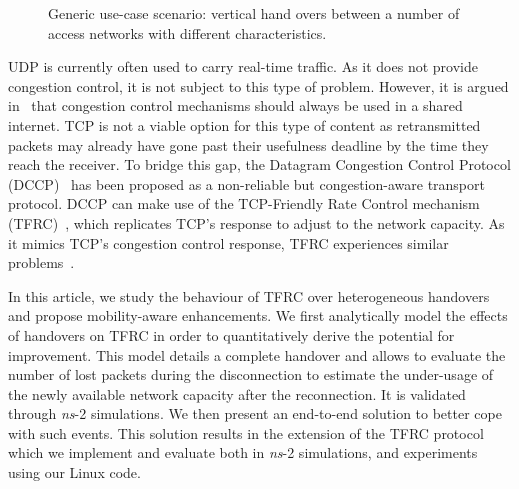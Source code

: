\documentclass[twocolumn]{nictatechreport}
\newcommand{\ns}{\textit{ns}}
\begin{document}
\begin{figure}[hb] \centering 
  
  \caption[Generic use-case scenario]{Generic use-case scenario: vertical hand
  overs between a number of access networks with different characteristics.}

  \label{fig:heterogeneous}
\end{figure} 

UDP is currently often used to carry real-time traffic. As it does not provide
congestion control, it is not subject to this type of problem. However, it is
argued in~\cite{1999floyd_end2end_congestion_control} that congestion control
mechanisms should always be used in a shared internet.  TCP is not a viable
option for this type of content as retransmitted packets may already have gone
past their usefulness deadline by the time they reach the receiver.  To bridge
this gap, the Datagram Congestion Control Protocol
(DCCP)~\cite{2006kohler_dccp,rfc4340} has been proposed as a non-reliable but
congestion-aware transport protocol. DCCP can make use of the TCP-Friendly Rate
Control mechanism
(TFRC)~\cite{2000floyd_equation-based_unicast,2003widmer_equation-based_unicast_multicast,rfc5348},
which replicates TCP's response to adjust to the network capacity.  As it mimics
TCP's congestion control response, TFRC experiences similar
problems~\cite{2004gurtov_tfrc_vertical_handovers}.

In this article, we study the behaviour of TFRC over heterogeneous handovers and
propose mobility-aware enhancements.  We first analytically model the effects of
handovers on TFRC in order to quantitatively derive the potential for
improvement. This model details a complete handover and allows to evaluate the
number of lost packets during the disconnection to estimate the under-usage of
the newly available network capacity after the reconnection. It is validated
through \ns-2 simulations.  We then present an end-to-end solution to better
cope with such events.  This solution results in the extension of the TFRC
protocol which we implement and evaluate both in \ns-2 simulations, and
experiments using our Linux code. 
\end{document}

